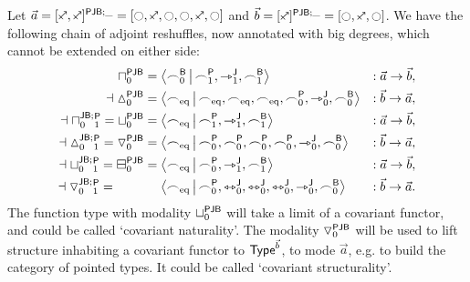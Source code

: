 \documentclass[a4paper]{memoir}
\begin{document}
\begin{example} \label{ex:pjb-paramty}
	Let $\vec a = \maskopypolar{[\ypolar, \ypolar]}{\maskpjb} = [\npolar, \ypolar, \npolar, \npolar, \ypolar, \npolar]$ and $\vec b = \maskopypolar{[\ypolar]}{\maskpjb} = [\npolar, \ypolar, \npolar]$.
	We have the following chain of adjoint reshuffles, now annotated with big degrees, which cannot be extended on either side:
	\begin{align*}
		\cohpi_0^{\maskopfont{PJB}} &= \reshlist{\nwbridgesym_0}{\nwpathsym_1, \nwjetsym_1, \nwbridgesym_1} &: \vec a \to \vec b, \\
		\dashv
		\cohdisc_0^{\maskopfont{PJB}} &= \reshlist{\eqtysym}{\eqtysym, \eqtysym, \eqtysym, \nwpathsym_0, \nwjetsym_0, \nwbridgesym_0} &: \vec b \to \vec a, \\
		\dashv
		\cohpi{}_0^{\maskopfont{JB};}{}_1^{\maskopfont{P}} =
		\cohfget_0^{\maskopfont{PJB}} &= \reshlist{\eqtysym}{\nwpathsym_1, \nwjetsym_1, \nwbridgesym_1} &: \vec a \to \vec b, \\
		\dashv
		\cohdisc{}_0^{\maskopfont{JB};}{}_1^{\maskopfont{P}} =
		\cohcodisc_0^{\maskopfont{PJB}} &= \reshlist{\eqtysym}{\nwpathsym_0, \nwpathsym_0, \nwpathsym_0, \nwpathsym_0, \nwjetsym_0, \nwbridgesym_0} &: \vec b \to \vec a, \\
		\dashv
		\cohfget{}_0^{\maskopfont{JB};}{}_1^{\maskopfont{P}} =
		\cohcopi_0^{\maskopfont{PJB}} &= 
		\reshlist{\eqtysym}{\nwpathsym_0, \nwjetsym_1, \nwbridgesym_1} &: \vec a \to \vec b, \\
		\dashv
		\cohcodisc{}_0^{\maskopfont{JB};}{}_1^{\maskopfont{P}} =
		\phantom{\cohcopi_0^{\maskopfont{PJB}}} &\mathrel{\phantom{=}} 
		\reshlist{\eqtysym}{\nwpathsym_0, \nwequijetsym_0, \nwequijetsym_0, \nwequijetsym_0, \nwjetsym_0, \nwbridgesym_0} &: \vec b \to \vec a.
	\end{align*}
	The function type with modality ${\sqcup}_0^{\mathsf{PJB}}$ will take a limit of a covariant functor, and could be called `covariant naturality'.
	The modality ${\triangledown}_0^{\mathsf{PJB}}$ will be used to lift structure inhabiting a covariant functor to ${\mathsf{Type}}^{\vec b}$, to mode $\vec a$, e.g. to build the category of pointed types. It could be called `covariant structurality'.
\end{example}
\end{document}
